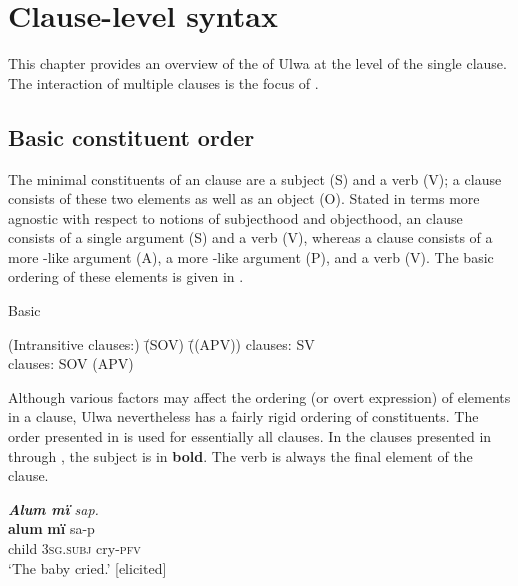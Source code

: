 \chapter{Clause-level syntax}\label{sec:11}


This chapter provides an overview of the  of Ulwa at the level of the single clause. The interaction of multiple clauses is the focus of .


\section{Basic constituent order}\label{sec:11.1}


The minimal constituents of an  clause are a subject (S) and a verb (V); a  clause consists of these two elements as well as an object (O). Stated in terms more agnostic with respect to notions of subjecthood and objecthood, an  clause consists of a single argument (S) and a verb (V), whereas a  clause consists of a more -like argument (A), a more -like argument (P), and a verb (V). The basic ordering of these elements is given in .

\ea%
    \label{ex:clause:1}
Basic 
\begin{tabbing}
{(Intransitive clauses:)} \= {(SOV)} \= {((APV))}\kill
{ clauses:} \> {SV} \> { }\\
{ clauses:} \> {SOV} \> {(APV)}
\end{tabbing}
\z

Although various  factors may affect the ordering (or overt expression) of elements in a clause, Ulwa nevertheless has a fairly rigid ordering of constituents. The order presented in  is used for essentially all  clauses. In the  clauses presented in  through , the subject is in \textbf{bold}. The verb is always the final element of the clause.

\ea%
    \label{ex:clause:2}
            \textit{\textbf{Alum mï} sap.}\\
\gll \textbf{alum}  \textbf{mï}      sa-p\\
    child  \textsc{3sg.subj}  cry-\textsc{pfv}\\
\glt `The baby cried.’ [elicited]
\z

